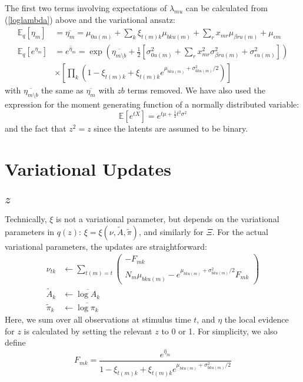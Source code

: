 \documentclass[11pt]{article}
\begin{document}
The first two terms involving expectations of $\lambda_{mu}$ can be calculated from (\ref{loglambda}) above and the variational ansatz:
\begin{align}
    \mathbb{E}_q [\eta_m] &= \overline{\eta_m} =  
    \mu_{0u(m)} + \sum_{k} \xi_{t(m) k} \mu_{bku(m)} + \sum_r x_{mr} \mu_{\beta r u(m)} + \mu_{\epsilon m} \\
    \mathbb{E}_q [e^{\eta_m}] &= \overline{e^{\eta_m}} = \exp \left( 
    \overline{\eta_{m \setminus b}}
    + \frac{1}{2} \left[ \sigma^2_{0u(m)} 
    + \sum_r x^2_{m r} \sigma^2_{\beta ru(m)} + \sigma^2_{\epsilon u(m)}
    \right]
    \right) \\ \nonumber
    &\times \left[
    \prod_k \left(
    1 - \xi_{t(m) k} + \xi_{t(m) k} e^{\mu_{bku(m)} + \sigma^2_{bku(m)} / 2}
    \right)\right]
\end{align}
with $\overline{\eta_{m \setminus b}}$ the same as $\overline{\eta_m}$ with $zb$ terms removed. We have also used the expression for the moment generating function of a normally distributed variable:
\begin{equation}
    \mathbb{E}[e^{tX}] = e^{t\mu + \frac{1}{2} t^2\sigma^2}
\end{equation}
and the fact that $z^2 = z$ since the latents are assumed to be binary.


\section{Variational Updates}

\subsection{$z$}
Technically, $\xi$ is not a variational parameter, but depends on the variational parameters in $q(z)$: $\xi = \xi(\nu, \tilde{A}, \tilde{\pi})$, and similarly for $\Xi$. For the actual variational parameters, the updates are straightforward:
\begin{align}
    \nu_{tk} &\leftarrow \sum_{t(m) = t} 
    \begin{pmatrix}
        - F_{mk} \\
        N_{m} \mu_{bku(m)} -
        e^{\mu_{bku(m)} + \sigma^2_{bku(m)} / 2} F_{mk} 
    \end{pmatrix} \\
    \tilde{A}_{k} &\leftarrow \overline{\log A_k} \\
    \tilde{\pi}_k &\leftarrow \overline{\log \pi_k}
\end{align}
Here, we sum over all observations at stimulus time $t$, and $\eta$ the local evidence for $z$ is calculated by setting the relevant $z$ to 0 or 1. For simplicity, we also define
\begin{equation}
    F_{mk} = \frac{\overline{e^{\eta_m}}}{1 - \xi_{t(m) k} + \xi_{t(m) k} e^{\mu_{bku(m)} + \sigma^2_{bku(m)} / 2}}
\end{equation}
\end{document}
